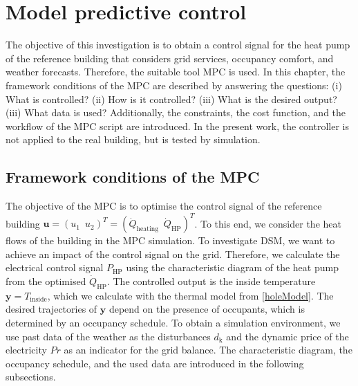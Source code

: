 \chapter{Model predictive control}
\label{ch:mpc}
The objective of this investigation is to obtain a control signal for the heat pump of the reference building that considers grid services, occupancy comfort, and weather forecasts. Therefore, the suitable tool MPC is used. In this chapter, the framework conditions of the MPC are described by answering the questions: (i) What is controlled? (ii) How is it controlled? (iii) What is the desired output? (iii) What data is used? Additionally, the constraints, the cost function, and the workflow of the MPC script are introduced. In the present work, the controller is not applied to the real building, but is tested by simulation. \newline

\section{Framework conditions of the MPC}
\label{section:FrameworkMPC}
The objective of the MPC is to optimise the control signal of the reference building \newline $\mathbf{u} = (u_1 \enspace u_2)^T = (\dot{Q}_\text{heating} \enspace \dot{Q}_\text{HP})^T$. To this end, we consider the heat flows of the building in the MPC simulation. To investigate DSM, we want to achieve an impact of the control signal on the grid. Therefore, we calculate the electrical control signal $P_\text{HP}$ using the characteristic diagram of the heat pump from the optimised $\dot{Q}_\text{HP}$. The controlled output is the inside temperature $\mathbf{y} = T_\text{inside}$, which we calculate with the thermal model from \autoref{holeModel}. The desired trajectories of $\mathbf{y}$ depend on the presence of occupants, which is determined by an occupancy schedule. To obtain a simulation environment, we use past data of the weather as the disturbances $d_\text{k}$ and the dynamic price of the electricity $Pr$  as an indicator for the grid balance. The characteristic diagram, the occupancy schedule, and the used data are introduced in the following subsections.    

